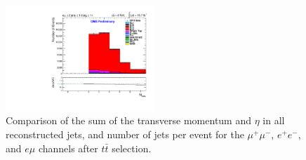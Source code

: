 \documentclass[oneside, a4paper, 11pt, ]{report}
\begin{document}
\begin{figure}
\includegraphics[width=0.5\textwidth]{Plots/ControlPlots/TTbarDiLeptonAnalysis/EMu/Jets/N_Jets_splitTTbar_ratio.pdf}
\caption{Comparison of the sum of the transverse momentum and $\eta$ in all reconstructed jets, and number of jets per event for the $\mu^{+}\mu^{-}$, $e^{+}e^{-}$, and $e\mu$ channels after $t\bar{t}$ selection.}
\label{fig-jetsAllPtAndEta}
\end{figure}
\end{document}
